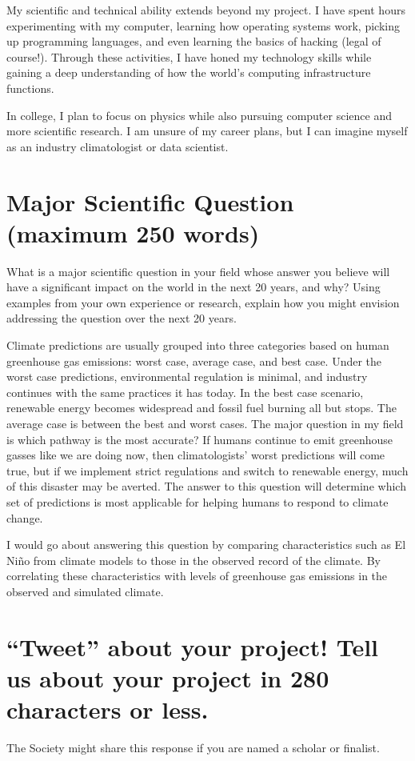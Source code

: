\documentclass[little]{basic}
\begin{document}
My scientific and technical ability extends beyond my project. I have spent hours experimenting with my computer, learning how operating systems work, picking up programming languages, and even learning the basics of hacking (legal of course!). Through these activities, I have honed my technology skills while gaining a deep understanding of how the world's computing infrastructure functions.

In college, I plan to focus on physics while also pursuing computer science and more scientific research. I am unsure of my career plans, but I can imagine myself as an industry climatologist or data scientist.

\section{Major Scientific Question (maximum 250 words)}
\label{sec:org97cb04c}
What is a major scientific question in your field whose answer you believe will have a significant impact on the world in the next 20 years, and why? Using examples from your own experience or research, explain how you might envision addressing the question over the next 20 years.

Climate predictions are usually grouped into three categories based on human greenhouse gas emissions: worst case, average case, and best case. Under the worst case predictions, environmental regulation is minimal, and industry continues with the same practices it has today. In the best case scenario, renewable energy becomes widespread and fossil fuel burning all but stops. The average case is between the best and worst cases. The major question in my field is which pathway is the most accurate? If humans continue to emit greenhouse gasses like we are doing now, then climatologists' worst predictions will come true, but if we implement strict regulations and switch to renewable energy, much of this disaster may be averted. The answer to this question will determine which set of predictions is most applicable for helping humans to respond to climate change.

I would go about answering this question by comparing characteristics such as El Niño from climate models to those in the observed record of the climate. By correlating these characteristics with levels of greenhouse gas emissions in the observed and simulated climate.

\section{``Tweet'' about your project! Tell us about your project in 280 characters or less.}
\label{sec:orgefbfab8}
The Society might share this response if you are named a scholar or finalist.
\end{document}
